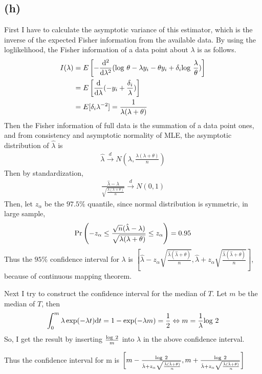 \documentclass{article}
\begin{document}
\subsection{(h)}
First I have to calculate the asymptotic variance of this estimator, which is the inverse of the expected Fisher information from the available data. By using the loglikelihood, the Fisher information of a data point about $\lambda$ is as follows.
\begin{align*}
	I(\lambda) &= E\left[ -\frac{\mathrm{d}^2}{\mathrm{d}\lambda^2} ({\rm log}\ \theta - \lambda y_i - \theta y_i + \delta_i {\rm log}\ \frac{\lambda}{\theta}) \right]\\
	&= E\left[ \frac{\mathrm{d}}{\mathrm{d}\lambda} (-y_i + \frac{\delta_i}{\lambda}) \right]\\
	&= E[\delta_i \lambda^{-2}] = \frac{1}{\lambda(\lambda+\theta)}
\end{align*}
Then the Fisher information of full data is the summation of a data point ones, and from consistency and asymptotic normality of MLE, the asymptotic distribution of $\hat{\lambda}$ is
\begin{align*}
	\hat{\lambda} \stackrel{d}{\longrightarrow} N \left(\lambda, \frac{\lambda(\lambda+\theta)}{n} \right)
\end{align*}
Then by standardization,
\begin{align*}
	\frac{\hat{\lambda} - \lambda}{\sqrt{\frac{\lambda(\lambda+\theta)}{n}}} \stackrel{d}{\longrightarrow} N(0, 1)
\end{align*}
Then, let $z_{\alpha}$ be the $97.5\%$ quantile, since normal distribution is symmetric, in large sample,
\begin{align*}
	{\rm Pr}\left( -z_{\alpha} \leq \frac{\sqrt{n}(\hat{\lambda} - \lambda)}{\sqrt{\lambda(\lambda+\theta)}} \leq z_{\alpha}\right) = 0.95
\end{align*}
Thus the $95\%$ confidence interval for $\lambda$ is $\left[ \hat{\lambda} - z_{\alpha} \sqrt{\frac{\hat{\lambda} (\hat{\lambda}+\theta)}{n}}, \hat{\lambda} + z_{\alpha} \sqrt{\frac{\hat{\lambda} (\hat{\lambda}+\theta)}{n}}\right]$, because of continuous mapping theorem.
\par
Next I try to construct the confidence interval for the median of $T$. Let $m$ be the median of $T$, then 
\begin{align*}
	\int_0^m \lambda \exp(-\lambda t) \mathrm{d}t =1-\exp(-\lambda m) = \frac{1}{2} \Leftrightarrow m = \frac{1}{\lambda} {\rm log}\ 2
\end{align*}
So, I get the result by inserting $\frac{{\rm log}\ 2}{m}$ into $\lambda$ in the above confidence interval. 
\par
Thus the confidence interval for m is $\left[ m - \frac{{\rm log}\ 2}{\hat{\lambda} + z_{\alpha}\sqrt{\frac{\hat{\lambda}(\hat{\lambda}+\theta)}{n}}}, m + \frac{{\rm log}\ 2}{\hat{\lambda} + z_{\alpha}\sqrt{\frac{\hat{\lambda}(\hat{\lambda}+\theta)}{n}}} \right]$
\end{document}
